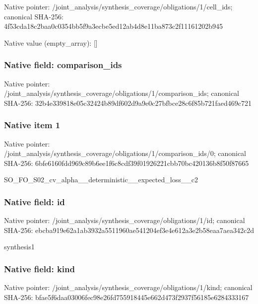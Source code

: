 \documentclass[10pt,a4paper]{article}
\begin{document}
Native pointer: /joint\_analysis/synthesi\allowbreak{}s\_coverage/obligations/1\allowbreak{}/cell\_ids; canonical SHA-256: 4f53cda18c2baa0c0354bb5f\allowbreak{}9a3ecbe5ed12ab4d8e11ba87\allowbreak{}3c2f11161202b945



Native value (empty\_array): []



\subsubsection{Native field: comparison\_ids}


Native pointer: /joint\_analysis/synthesi\allowbreak{}s\_coverage/obligations/1\allowbreak{}/comparison\_ids; canonical SHA-256: 32b4e339818e05c32424b89d\allowbreak{}f602d9a9e0c27bfbce28c6f8\allowbreak{}5b721faed469c721



\subsubsection{Native item 1}


Native pointer: /joint\_analysis/synthesi\allowbreak{}s\_coverage/obligations/1\allowbreak{}/comparison\_ids/0; canonical SHA-256: 6bfe6160fdd969c89b6ee1f6\allowbreak{}c8cdf39f01926221cbb70bc4\allowbreak{}20136b8f50f87665


SO\_FO\_S02\_cv\_alpha\_\_dete\allowbreak{}rministic\_\_expected\_loss\allowbreak{}\_\_c2


\subsubsection{Native field: id}


Native pointer: /joint\_analysis/synthesi\allowbreak{}s\_coverage/obligations/1\allowbreak{}/id; canonical SHA-256: ebcba919e62a1ab3932a5511\allowbreak{}960ae541204ef3e4e612a3e2\allowbreak{}b58eaa7aea342c2d


synthesis1


\subsubsection{Native field: kind}


Native pointer: /joint\_analysis/synthesi\allowbreak{}s\_coverage/obligations/1\allowbreak{}/kind; canonical SHA-256: bfae5f6daa03006fec98e26f\allowbreak{}d755918445e662d473f2937f\allowbreak{}56185e6284333167
\end{document}
